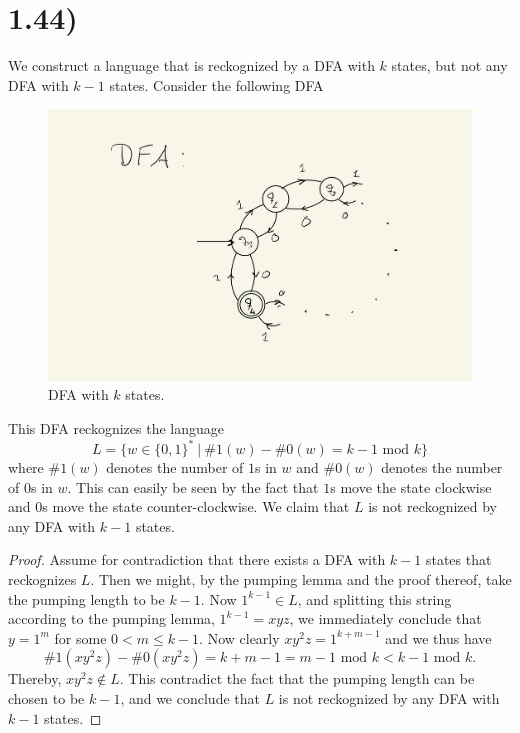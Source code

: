 \documentclass[a4paper,11pt]{article}
\numberwithin{equation}{section}
\begin{document}
\section*{1.44)}
We construct a language that is reckognized by a DFA with $k$ states, but not any DFA with $k-1$ states. Consider the following DFA
\begin{figure}[htp]
    \centering
    \includegraphics[width=14cm]{144.jpg}
    \caption{DFA with $k$ states.}
    \label{fig:1.44}
\end{figure}
\vspace{1cm}
This DFA reckognizes the language \begin{equation*}
    L=\{w\in\{0,1\}^\ast\ \vert\ \#1(w)-\#0(w)=k-1 \text{ mod } k\}
\end{equation*}
where $\#1(w)$ denotes the number of $1$s in $w$ and $\#0(w)$ denotes the number of $0$s in $w$. This can easily be seen by the fact that $1$s move the state clockwise and $0$s move the state counter-clockwise.
We claim that $L$ is not reckognized by any DFA with $k-1$ states.
\begin{proof}
Assume for contradiction that there exists a DFA with $k-1$ states that reckognizes $L$. Then we might, by the pumping lemma and the proof thereof, take the pumping length to be $k-1$. Now $1^{k-1}\in L$, and splitting this string according to the pumping lemma, $1^{k-1}=xyz$, we immediately conclude that $y=1^m$ for some $0<m\leq k-1$. Now clearly $xy^2z=1^{k+m-1}$ and we thus have \begin{equation*}
    \#1(xy^2z)-\#0(xy^2z)=k+m-1=m-1 \text{ mod }k<k-1\text{ mod }k.
\end{equation*}
Thereby, $xy^2z\notin L$. This contradict the fact that the pumping length can be chosen to be $k-1$, and we conclude that $L$ is not reckognized by any DFA with $k-1$ states.
\end{proof}
\end{document}
